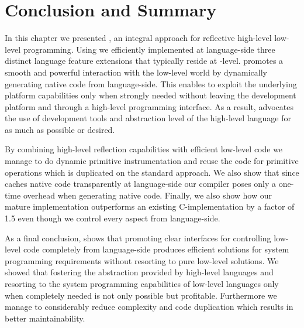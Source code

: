 \section{Conclusion and Summary}

In this chapter we presented \B, an integral approach for reflective high-level low-level programming.
Using \B we efficiently implemented at language-side three distinct language feature extensions that typically reside at \VM-level.
\B promotes a smooth and powerful interaction with the low-level world by dynamically generating native code from language-side.
This enables to exploit the underlying platform capabilities only when strongly needed without leaving the development platform and through a high-level programming interface. 
As a result, \B advocates the use of development tools and abstraction level of the high-level language for as much as possible or desired.

By combining high-level reflection capabilities with efficient low-level code we manage to do dynamic primitive instrumentation and reuse the code for primitive operations which is duplicated on the standard \JIT approach.
We also show that since \B caches native code transparently at language-side our \JIT compiler poses only a one-time overhead when generating native code. 
Finally, we also show how our mature \FFI implementation outperforms an existing C-\FFI implementation by a factor of 1.5 even though we control every aspect from language-side.


As a final conclusion, \B shows that promoting clear interfaces for controlling low-level code completely from language-side produces efficient solutions for system programming requirements without resorting to pure low-level solutions.
We showed that fostering the abstraction provided by high-level languages and resorting to the system programming capabilities of low-level languages only when completely needed is not only possible but profitable.
Furthermore we manage to considerably reduce complexity and code duplication which results in better maintainability.



